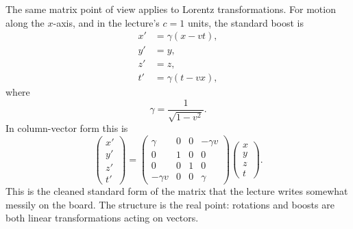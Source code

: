 The same matrix point of view applies to Lorentz transformations. For motion along the \(x\)-axis, and in the lecture's \(c=1\) units, the standard boost is
\begin{align}
x' &= \gamma(x-vt), \\
y' &= y, \\
z' &= z, \\
t' &= \gamma(t-vx),
\end{align}
where
\begin{equation}
\gamma = \frac{1}{\sqrt{1-v^2}}.
\end{equation}
In column-vector form this is
\begin{equation}
\begin{pmatrix}
x' \\ y' \\ z' \\ t'
\end{pmatrix}
=
\begin{pmatrix}
\gamma & 0 & 0 & -\gamma v \\
0 & 1 & 0 & 0 \\
0 & 0 & 1 & 0 \\
-\gamma v & 0 & 0 & \gamma
\end{pmatrix}
\begin{pmatrix}
x \\ y \\ z \\ t
\end{pmatrix}.
\end{equation}
This is the cleaned standard form of the matrix that the lecture writes somewhat messily on the board. The structure is the real point: rotations and boosts are both linear transformations acting on vectors.

